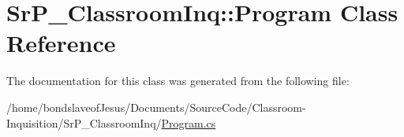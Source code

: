\hypertarget{class_sr_p___classroom_inq_1_1_program}{
\section{\-Sr\-P\-\_\-\-Classroom\-Inq\-:\-:\-Program \-Class \-Reference}
\label{class_sr_p___classroom_inq_1_1_program}
}


\-The documentation for this class was generated from the following file\-:\begin{DoxyCompactItemize}
\item 
/home/bondslaveof\-Jesus/\-Documents/\-Source\-Code/\-Classroom-\/\-Inquisition/\-Sr\-P\-\_\-\-Classroom\-Inq/\hyperlink{_program_8cs}{\-Program.\-cs}\end{DoxyCompactItemize}
